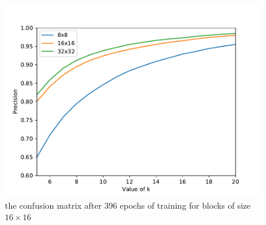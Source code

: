 \begin{figure}
    \centering
    \includegraphics[width=\textwidth,height=\textheight,keepaspectratio]{Figures/topkPrecisions.pdf}
    \caption[the confusion
matrix after 396 epochs of training for blocks
of size \(16\times16\)]
    {the confusion
matrix after 396 epochs of training for blocks
of size \(16\times16\)}\label{fig:topkPrecisions}
\end{figure}
